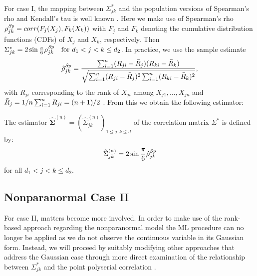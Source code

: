For case I, the mapping between $\Sigma_{jk}^*$ and the population versions of Spearman's rho and Kendall's tau is well known \citep{Liu09}. Here we make use of Spearman's rho $\rho^{\text{\textit{Sp}}}_{jk} = corr(F_j(X_j),F_k(X_k))$ with $F_j$ and $F_k$ denoting the cumulative distribution functions (CDFs) of $X_j$ and $X_k$, respectively. Then $\Sigma_{jk}^* = 2\sin{\frac{\pi}{6} \rho^{\text{\textit{Sp}}}_{jk}} \quad \text{for } d_1  < j < k \leq d_2$. In practice, we use the sample estimate 
\begin{equation*}
    \hat{\rho}^{\text{\textit{Sp}}}_{jk} = \frac{\sum_{i=1}^n (R_{ji} - \Bar{R}_{j}) (R_{ki} - \Bar{R}_{k})}{\sqrt{\sum_{i=1}^n(R_{ji} - \Bar{R}_{j})^2\sum_{i=1}^n(R_{ki} - \Bar{R}_{k})^2}},
\end{equation*}
with $R_{ji}$ corresponding to the rank of $X_{ji}$ among $X_{j1}, \dots, X_{jn}$ and $\Bar{R}_{j} = 1/n \sum_{i=1}^n R_{ji} = (n+1)/2$ \citep[similar setup as][]{Liu12}. From this we obtain the following estimator:
\begin{definition}\label{case1_nonpara}
    The estimator $\hat{\boldsymbol{\Sigma}}^{(n)} = (\hat{\Sigma}_{jk}^{(n)})_{1\leq j, k\leq d}$ of the correlation matrix $\Sigma^*$ is defined by:
    \begin{equation}
            \hat{\Sigma}_{jk}^{(n)} = 2\sin{\frac{\pi}{6} \hat{\rho}^{\text{\textit{Sp}}}_{jk}}
    \end{equation}
    for all $d_1 < j < k \leq d_2$.
\end{definition}

\subsection{Nonparanormal Case II}\label{sec::nonparanormal_case2} 

For case II, matters become more involved. In order to make use of the rank-based approach regarding the nonparanormal model the ML procedure can no longer be applied as we do not observe the continuous variable in its Gaussian form.  Instead, we will proceed by suitably modifying other approaches that address the Gaussian case through more direct examination of
the relationship between $\Sigma_{jk}^*$ and the point polyserial correlation \citep{Bedrick92,Bedrick96}. 

